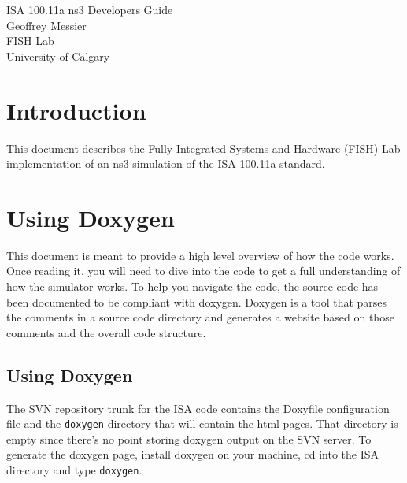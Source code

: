 \documentclass[12pt,letterpaper]{article}
\begin{document}
\thispagestyle{empty}

\begin{center}
\Large{ISA 100.11a ns3 Developers Guide}\\[2mm]
\large{Geoffrey Messier\\
FISH Lab\\
University of Calgary}
\end{center}
\vspace{0.5cm}


\newcommand{\I}{\item}

\section{Introduction}

This document describes the Fully Integrated Systems and Hardware (FISH) Lab implementation of an ns3 simulation of the ISA 100.11a standard.  


\section{Using Doxygen}
\label{sec:doxygen}

This document is meant to provide a high level overview of how the code works.  Once reading it, you will need to dive into the code to get a full understanding of how the simulator works.  To help you navigate the code, the source code has been documented to be compliant with doxygen.  Doxygen is a tool that parses the comments in a source code directory and generates a website based on those comments and the overall code structure.

\subsection{Using Doxygen}

The SVN repository trunk for the ISA code contains the Doxyfile configuration file and the {\tt doxygen} directory that will contain the html pages.  That directory is empty since there's no point storing doxygen output on the SVN server.  To generate the doxygen page, install doxygen on your machine, cd into the ISA directory and type {\tt doxygen}.


\end{document}
